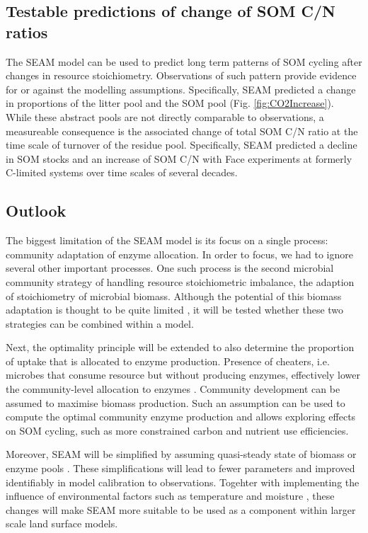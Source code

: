 \subsection{Testable predictions of change of SOM C/N ratios}
The SEAM model can be used to predict long term patterns of SOM cycling after
changes in resource stoichiometry. Observations of such pattern provide evidence
for or against the modelling assumptions.
Specifically, SEAM predicted a change in proportions of the litter pool and the
SOM pool (Fig. \ref{fig:CO2Increase}). While these abstract pools are not
directly comparable to observations, a measureable consequence is the associated
change of total SOM C/N ratio at the time scale of turnover of the residue
pool. Specifically, SEAM predicted a decline in SOM stocks and an increase of
SOM C/N with Face experiments at formerly C-limited systems over time scales of
several decades.
 
\subsection{Outlook} 
The biggest limitation of the SEAM model is its focus on a single process:
community adaptation of enzyme allocation. In order to focus, we had to ignore
several other important processes. One such process is the second microbial
community strategy of handling resource stoichiometric imbalance,
the adaption of stoichiometry of microbial biomass. Although the potential of this biomass
adaptation is thought to be quite limited \citep{Mooshammer14}, it will be
tested whether these two strategies can be combined within a model.

Next, the optimality principle will be extended to also determine the proportion
of uptake that is allocated to enzyme production. Presence of cheaters, i.e.
microbes that consume resource but without producing enzymes, effectively lower
the community-level allocation to enzymes \citep{Kaiser14}. Community
development can be assumed to maximise biomass production. Such an assumption
can be used to compute the optimal community enzyme production and allows
exploring effects on SOM cycling, such as more constrained carbon and nutrient
use efficiencies.

Moreover, SEAM will be simplified by assuming quasi-steady state of biomass or
enzyme pools \citep{Wutzler13}. These simplifications will lead to fewer
parameters and improved identifiably in model calibration to observations.
Togehter with implementing the influence of environmental factors such as
temperature and moisture \citep{Davidson12}, these changes will make SEAM more
suitable to be used as a component within larger scale land surface models.
 

